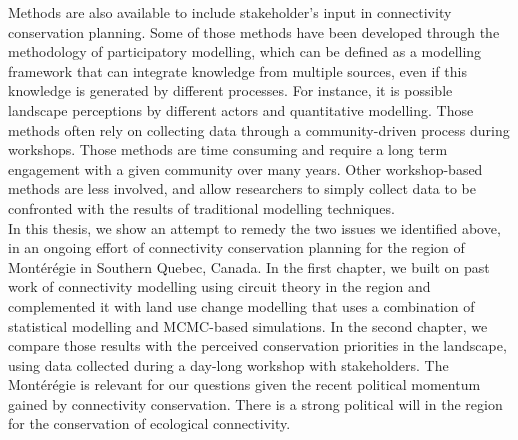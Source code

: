 \documentclass[12pt,Bold,TexShade]{mcgilletdclass}
\begin{document}
{Methods are also available to include stakeholder’s input in connectivity conservation planning. Some of those methods have been developed through the methodology of participatory modelling, which can be defined as a modelling framework that can integrate knowledge from multiple sources, even if this knowledge is generated by different processes. For instance, it is possible landscape perceptions by different actors and quantitative modelling. Those methods often rely on collecting data through a community-driven process during workshops. Those methods are time consuming and require a long term engagement with a given community over many years. Other workshop-based methods are less involved, and allow researchers to simply collect data to be confronted with the results of traditional modelling techniques.\\

In this thesis, we show an attempt to remedy the two issues we identified above,  in an ongoing effort of connectivity conservation planning for the region of Montérégie in Southern Quebec, Canada. In the first chapter, we built on past work of connectivity modelling using circuit theory in the region and complemented it with land use change modelling that uses a combination of statistical modelling and MCMC-based simulations. In the second chapter, we compare those results with the perceived conservation priorities in the landscape, using data collected during a day-long workshop with stakeholders. The Montérégie is relevant for our questions given the recent political momentum gained by connectivity conservation. There is a strong political will in the region for the conservation of ecological connectivity.
}%
\Intro



\Link



% 
%
%
\Link%

%


%
\printbibliography[heading=bibintoc, title={\textbf{Bibliography} \hspace{1em}}]
\end{document}
